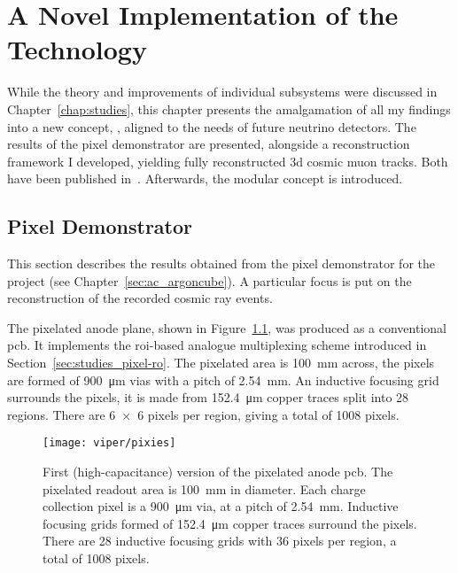 \chapter{A Novel Implementation of the  Technology}
\label{chap:ac}

While the theory and improvements of individual \lartpc{} subsystems were discussed in Chapter~\ref{chap:studies}, this chapter presents the amalgamation of all my findings into a new \lartpc{} concept, \AC{}, aligned to the needs of future \lartpc{} neutrino detectors.
The results of the \AC{} pixel demonstrator are presented, alongside a reconstruction framework I developed, yielding fully reconstructed \gls{3d} cosmic muon tracks.
Both have been published in~\cite{pixel_paper, pixel_proceedings}.
Afterwards, the \AC{} modular \lartpc{} concept is introduced.


\section{\AC{} Pixel Demonstrator}
\label{sec:ac_viper}

This section describes the results obtained from the pixel demonstrator for the \AC{} project (see Chapter~\ref{sec:ac_argoncube}).
A particular focus is put on the reconstruction of the recorded cosmic ray events.
 
The pixelated anode plane, shown in Figure~\ref{fig:viper_pixies}, was produced as a conventional \gls{pcb}.
It implements the \gls{roi}-based analogue multiplexing scheme introduced in Section~\ref{sec:studies_pixel-ro}.
The pixelated area is \SI{100}{\milli\metre} across, the pixels are formed of \SI{900}{\micro\metre} vias with a pitch of \SI{2.54}{\milli\metre}.
An inductive focusing grid surrounds the pixels, it is made from \SI{152.4}{\micro\metre} copper traces split into 28 regions.
There are \num{6 x 6} pixels per region, giving a total of 1008 pixels. 

\begin{figure}[htb]
	\centering
	\texttt{[image: viper/pixies]}
	\caption[Pixel demonstrator readout plane]{%
		First (high-capacitance) version of the pixelated anode \acrshort{pcb}.
		The pixelated readout area is \SI{100}{\milli\metre} in diameter.
		Each charge collection pixel is a \SI{900}{\micro\metre} via, at a pitch of \SI{2.54}{\milli\metre}.
		Inductive focusing grids formed of \SI{152.4}{\micro\metre} copper traces surround the pixels.
		There are \num{28} inductive focusing grids with \num{36} pixels per region, a total of \num{1008} pixels.
	}
	\label{fig:viper_pixies}
\end{figure}

